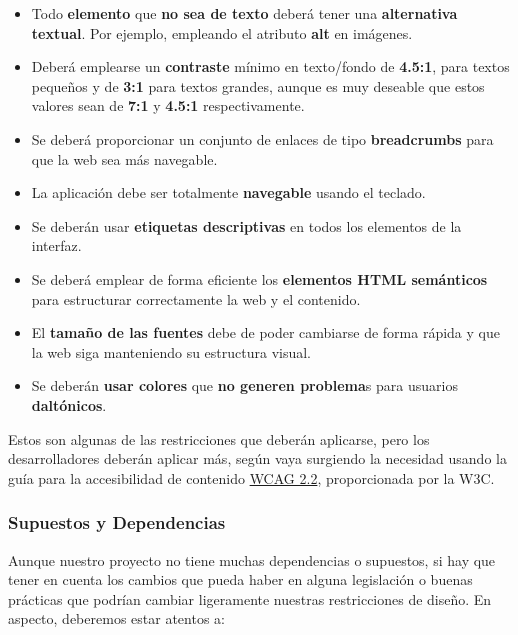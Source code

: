 \begin{itemize}
	\item Todo \textbf{elemento} que \textbf{no sea de texto} deberá tener una \textbf{alternativa textual}. Por ejemplo, empleando el atributo \textbf{alt} en imágenes.
	
	\item Deberá emplearse un \textbf{contraste} mínimo en texto/fondo de \textbf{4.5:1}, para textos pequeños y de \textbf{3:1} para textos grandes, aunque es muy deseable que estos valores sean de \textbf{7:1} y \textbf{4.5:1} respectivamente.
	
	\item Se deberá proporcionar un conjunto de enlaces de tipo \textbf{breadcrumbs} para que la web sea más navegable.
	
	\item La aplicación debe ser totalmente \textbf{navegable} usando el teclado.
	
	\item Se deberán usar \textbf{etiquetas descriptivas} en todos los elementos de la interfaz.
	
	\item Se deberá emplear de forma eficiente los \textbf{elementos HTML semánticos} para estructurar correctamente la web y el contenido.
	
	\item El \textbf{tamaño de las fuentes} debe de poder cambiarse de forma rápida y que la web siga manteniendo su estructura visual.
	
	\item Se deberán \textbf{usar colores} que \textbf{no generen problema}s para usuarios \textbf{daltónicos}.
\end{itemize}

Estos son algunas de las restricciones que deberán aplicarse, pero los desarrolladores deberán aplicar más, según vaya surgiendo la necesidad usando la guía para la accesibilidad de contenido \href{https://www.w3.org/TR/WCAG22/}{WCAG 2.2}, proporcionada por la W3C.

\subsubsection{Supuestos y Dependencias}
Aunque nuestro proyecto no tiene muchas dependencias o supuestos, si hay que tener en cuenta los cambios que pueda haber en alguna legislación o buenas prácticas que podrían cambiar ligeramente nuestras restricciones de diseño. En aspecto, deberemos estar atentos a:

